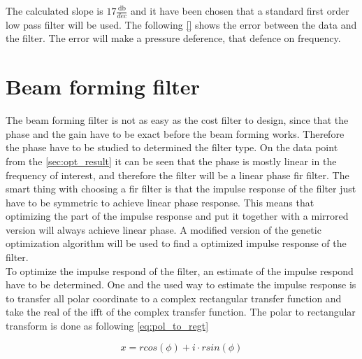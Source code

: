     \startexplain
    \stopexplain
    
The calculated slope is $17 \frac{\si{\decibel}}{dec}$ and it have been chosen that a standard first order low pass filter will be used. The following \autoref{} shows the error between the data and the filter. The error will make a pressure deference, that defence on frequency. 


\section{Beam forming filter}
The beam forming filter is not as easy as the cost filter to design, since that the phase and the gain have to be exact before the beam forming works. Therefore the phase have to be studied to determined the filter type. On the data point from the \ref{sec:opt_result} it can be seen that the phase is mostly linear in the frequency of interest, and therefore the filter will be a linear phase \gls{fir} filter. The smart thing with choosing a \gls{fir} filter is that the impulse response of the filter just have to be symmetric to achieve linear phase response. This means that optimizing the part of the impulse response and put it together with a mirrored version will always achieve linear phase. A modified version of the genetic optimization algorithm will be used to find a optimized impulse response of the filter. \\

To optimize the impulse respond of the filter, an estimate of the impulse respond have to be determined. One and the used way to estimate the impulse response is to transfer all polar coordinate to a complex rectangular transfer function and take the real of the \gls{ifft} of the complex transfer function. The polar to rectangular transform is done as following \autoref{eq:pol_to_regt}

\begin{equation}\label{eq:pol_to_regt}
x=rcos(\phi)+i \cdot rsin(\phi)
\end{equation}


     \startexplain
    \stopexplain

